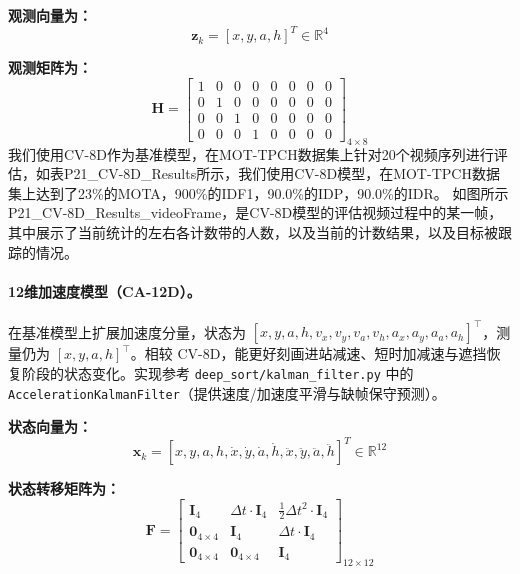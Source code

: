 \textbf{观测向量为：}
\begin{equation}
\mathbf{z}_k = [x, y, a, h]^T \in \mathbb{R}^{4}
\end{equation}

\textbf{观测矩阵为：}
\begin{equation}
\mathbf{H} = \begin{bmatrix}
1 & 0 & 0 & 0 & 0 & 0 & 0 & 0 \\
0 & 1 & 0 & 0 & 0 & 0 & 0 & 0 \\
0 & 0 & 1 & 0 & 0 & 0 & 0 & 0 \\
0 & 0 & 0 & 1 & 0 & 0 & 0 & 0
\end{bmatrix}_{4 \times 8}
\end{equation}
我们使用CV-8D作为基准模型，在MOT-TPCH数据集上针对20个视频序列进行评估，如表P21_CV-8D_Results所示，我们使用CV-8D模型，在MOT-TPCH数据集上达到了23\%的MOTA，900\%的IDF1，90.0\%的IDP，90.0\%的IDR。
如图所示P21_CV-8D_Results_videoFrame，是CV-8D模型的评估视频过程中的某一帧，其中展示了当前统计的左右各计数带的人数，以及当前的计数结果，以及目标被跟踪的情况。


\paragraph{12维加速度模型（CA-12D）。} 在基准模型上扩展加速度分量，状态为 \([x, y, a, h, v_x, v_y, v_a, v_h, a_x, a_y, a_a, a_h]^\top\)，测量仍为 \([x, y, a, h]^\top\)。相较 CV-8D，能更好刻画进站减速、短时加减速与遮挡恢复阶段的状态变化。实现参考 \texttt{deep\_sort/kalman\_filter.py} 中的 \texttt{AccelerationKalmanFilter}（提供速度/加速度平滑与缺帧保守预测）。


\textbf{状态向量为：}
\begin{equation}
\mathbf{x}_k = [x, y, a, h, \dot{x}, \dot{y}, \dot{a}, \dot{h}, \ddot{x}, \ddot{y}, \ddot{a}, \ddot{h}]^T \in \mathbb{R}^{12}
\end{equation}

\textbf{状态转移矩阵为：}
\begin{equation}
\mathbf{F} = \begin{bmatrix}
\mathbf{I}_4 & \Delta t \cdot \mathbf{I}_4 & \frac{1}{2}\Delta t^2 \cdot \mathbf{I}_4 \\
\mathbf{0}_{4 \times 4} & \mathbf{I}_4 & \Delta t \cdot \mathbf{I}_4 \\
\mathbf{0}_{4 \times 4} & \mathbf{0}_{4 \times 4} & \mathbf{I}_4
\end{bmatrix}_{12 \times 12}
\end{equation}

